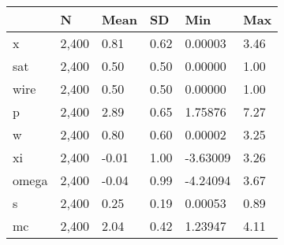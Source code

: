 \begin{table}[htbp]
\begin{tabular}{|l|l|l|l|l|l|}\hline  
 & N  & Mean  & SD  & Min  & Max  \\ \hline  
x &     2,400 &      0.81 &      0.62 &   0.00003 &      3.46 \\ \hline 
sat &     2,400 &      0.50 &      0.50 &   0.00000 &      1.00 \\ \hline 
wire &     2,400 &      0.50 &      0.50 &   0.00000 &      1.00 \\ \hline 
p &     2,400 &      2.89 &      0.65 &   1.75876 &      7.27 \\ \hline 
w &     2,400 &      0.80 &      0.60 &   0.00002 &      3.25 \\ \hline 
xi &     2,400 &     -0.01 &      1.00 &  -3.63009 &      3.26 \\ \hline 
omega &     2,400 &     -0.04 &      0.99 &  -4.24094 &      3.67 \\ \hline 
s &     2,400 &      0.25 &      0.19 &   0.00053 &      0.89 \\ \hline 
mc &     2,400 &      2.04 &      0.42 &   1.23947 &      4.11 \\ \hline 
  \end{tabular}
\end{table}
